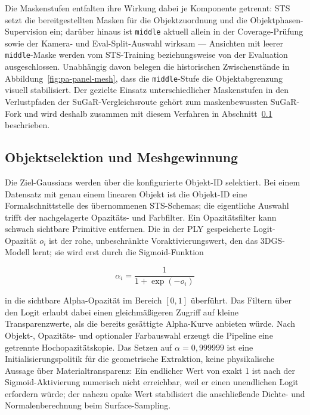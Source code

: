 Die Maskenstufen entfalten ihre Wirkung dabei je Komponente getrennt: STS
setzt die bereitgestellten Masken für die Objektzuordnung und die
Objektphasen-Supervision ein; darüber hinaus ist \texttt{middle} aktuell
allein in der Coverage-Prüfung sowie der Kamera- und Eval-Split-Auswahl
wirksam — Ansichten mit leerer \texttt{middle}-Maske werden vom STS-Training
beziehungsweise von der Evaluation ausgeschlossen. Unabhängig davon belegen
die historischen Zwischenstände in Abbildung~\ref{fig:pa-panel-mesh}, dass
die \texttt{middle}-Stufe die Objektabgrenzung visuell stabilisiert. Der
gezielte Einsatz unterschiedlicher Maskenstufen in den Verlustpfaden der
SuGaR-Vergleichsroute gehört zum maskenbewussten SuGaR-Fork und wird deshalb
zusammen mit diesem Verfahren in Abschnitt~\ref{subsec:meshgewinnung}
beschrieben.

\subsection{Objektselektion und Meshgewinnung}
\label{subsec:meshgewinnung}

Die Ziel-Gaussians werden über die konfigurierte Objekt-ID selektiert. Bei einem
Datensatz mit genau einem linearen Objekt ist die Objekt-ID eine
Formalschnittstelle des übernommenen STS-Schemas; die eigentliche Auswahl
trifft der nachgelagerte Opazitäts- und Farbfilter. Ein Opazitätsfilter kann
schwach sichtbare Primitive entfernen. Die in der PLY gespeicherte
Logit-Opazität $o_i$ ist der rohe, unbeschränkte Voraktivierungswert, den das
3DGS-Modell lernt; sie wird erst durch die Sigmoid-Funktion

\begin{equation}
	\alpha_i = \frac{1}{1+\exp(-o_i)}
	\label{eq:opacity}
\end{equation}

in die sichtbare Alpha-Opazität im Bereich $[0,1]$ überführt. Das Filtern über
den Logit erlaubt dabei einen gleichmäßigeren Zugriff auf kleine
Transparenzwerte, als die bereits gesättigte Alpha-Kurve anbieten würde. Nach
Objekt-, Opazitäts- und optionaler Farbauswahl erzeugt die Pipeline eine
getrennte Hochopazitätskopie. Das Setzen auf $\alpha=0{,}999999$ ist eine
Initialisierungspolitik für die geometrische Extraktion, keine physikalische
Aussage über Materialtransparenz: Ein endlicher Wert von exakt 1 ist nach der
Sigmoid-Aktivierung numerisch nicht erreichbar, weil er einen unendlichen
Logit erfordern würde; der nahezu opake Wert stabilisiert die anschließende
Dichte- und Normalenberechnung beim Surface-Sampling.

